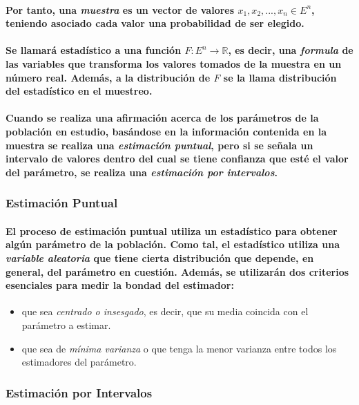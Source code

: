 \paragraph{
Por tanto, una \emph{muestra} es un vector de valores ${x_1,x_2,...,x_n} \in E^n$, teniendo asociado cada valor una probabilidad de ser elegido.
}
\paragraph{
Se llamará estadístico a una función $F: E^n \rightarrow \mathbb{R}$, es decir, una \emph{formula} de las variables que transforma los valores tomados de la muestra en un número real. Además, a la distribución de $F$ se la llama distribución del estadístico en el muestreo.
}
\paragraph{
Cuando se realiza una afirmación acerca de los parámetros de la población en estudio, basándose en la información contenida en la muestra se realiza una \emph{estimación puntual}, pero si se señala un intervalo de valores dentro del cual se tiene confianza que esté el valor del parámetro, se realiza una \emph{estimación por intervalos}.
}

\subsubsection{Estimación Puntual}
\paragraph{
El proceso de estimación puntual utiliza un estadístico para obtener algún parámetro de la población. Como tal, el estadístico utiliza una \emph{variable aleatoria} que tiene cierta distribución que depende, en general, del parámetro en cuestión. Además, se utilizarán dos criterios esenciales para medir la bondad del estimador:
}
\begin{itemize}
\item que sea \emph{centrado o insesgado}, es decir, que su media coincida con el parámetro a estimar.
\item que sea de \emph{mínima varianza} o que tenga la menor varianza entre todos los estimadores del parámetro.
\end{itemize}

\subsubsection{Estimación por Intervalos}
